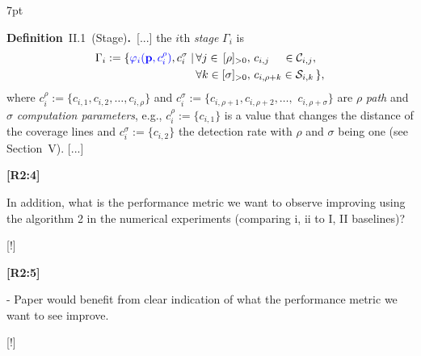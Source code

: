 \documentclass[10pt]{letter}
\newenvironment{formal}{%
  \def\FrameCommand{%
    \hspace{1pt}%
    {\color{red}\vrule width 2pt}%
    {\color{formalshade}\vrule width 4pt}%
    \colorbox{formalshade}%
  }%
  \MakeFramed{\advance\hsize-\width\FrameRestore}%
  \noindent\hspace{-4.55pt}%
  \begin{adjustwidth}{}{7pt}%
  \vspace{2pt}\vspace{2pt}%
}
{%
  \vspace{2pt}\end{adjustwidth}\endMakeFramed%
}
\begin{document}
{  \begin{formal}
    \color{black} 
    \textbf{Definition}~II.1~(Stage)\textbf{.}~[...] the $i$th \emph{stage} $\Gamma_i$ %
      is
    \begin{equation*}\begin{split}
        \Gamma_i:=\{{\color{blue}\varphi_i(\mathbf{p}%
        ,c_i^\rho)},c_i^\sigma\mid
        \,&\forall j\in\,[\rho]_{>0},\,c_{i,j}\,\,\,\,\,\,\,\in\mathcal{C}_{i,j},\,\\
          &\forall k\in[\sigma]_{>0},\,c_{i,\rho+k}\in\mathcal{S}_{i,k}\,\},
    \end{split}\end{equation*}
    where $c_i^\rho${\color{blue}$:=\{c_{i,1},c_{i,2},\dots,c_{i,\rho}\}$} and $c_i^\sigma${\color{blue}$:=\{c_{i,\rho+1},c_{i,\rho+2},\dots,$ $c_{i,\rho+\sigma}\}$} are $\rho$ \emph{path} and $\sigma$ \emph{computation parameters}{\color{blue}, e.g., $c_i^\rho:=\{c_{i,1}\}$ is a value that changes the distance of the coverage lines and $c^\sigma_i:=\{c_{i,2}\}$ the detection rate with $\rho$ and $\sigma$ being one (see Section~{\color{red}V})}. [...]
    \vspace*{1ex}
  \end{formal}



  }

  {\hspace*{-4.5em}\textbf{[R2:4]}\vspace*{-1.9em}}

  In addition, what is the performance metric we want to observe improving using the algorithm 2 in the numerical experiments (comparing i, ii to I, II baselines)? 
  
  {\color{blue} 
  
  {\hspace*{-4.5em}{[R2:4]}\vspace*{-1.9em}}

  [!]}

{\hspace*{-4.5em}\textbf{[R2:5]}\vspace*{-1.9em}}

- Paper would benefit from clear indication of what the performance metric we want to see improve. 
  
{\color{blue} 
  
{\hspace*{-4.5em}{[R2:5]}\vspace*{-1.9em}}
  
[!]}
\end{document}
